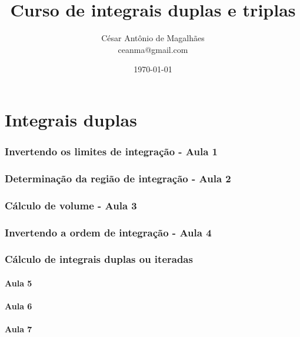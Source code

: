 \documentclass[12pt, a4paper]{article}
\title{Curso de integrais duplas e triplas}
\author{César Antônio de Magalhães \\ ceanma@gmail.com}
\date{\today}
\begin{document}
	\maketitle\newpage
	
	\tableofcontents\newpage
	
	\listoftables\newpage
	
	\listoffigures\newpage
	
	
	\part{Integrais duplas}	
		\section{Invertendo os limites de integração - Aula 1}			
					
		\section{Determinação da região de integração - Aula 2}		
					
		\section{Cálculo de volume - Aula 3}
					
		\section{Invertendo a ordem de integração - Aula 4}
					
		\section{Cálculo de integrais duplas ou iteradas}
			\subsection{Aula 5}
						
			\subsection{Aula 6}
						
			\subsection{Aula 7}
						
\end{document}
